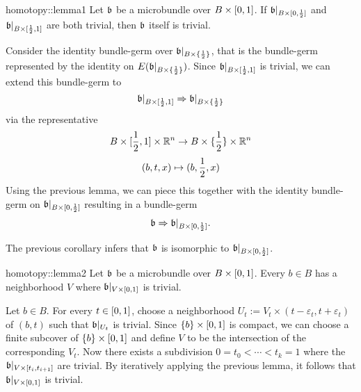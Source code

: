 \begin{scope}
\newcommand{\A}[1][] {
    A_\alpha#1
}

\newcommand{\bbleft} {
    \bb\restr{B \times{} [0, \half]}
}
\newcommand{\bbright} {
    \bb\restr{B \times{} [\half, 1]}
}
\newcommand{\bbhalf} {
    \bb\restr{B \times{} \{ \half \}}
}

\begin{mylemma}{homotopy::lemma1}
    Let $\mathfrak{b}$ be a microbundle over $B \times [0, 1]$. If $\bbleft$ and $\bbright$ are both trivial,
    then $\mathfrak{b}$ itself is trivial.
\end{mylemma}
\begin{myproof}
    Consider the identity bundle-germ over $\bbhalf$, that is the bundle-germ represented by the identity on $E(\bbhalf)$.
    Since $\bbright$ is trivial, we can extend this bundle-germ to 
    \[ \bbright \double \bbhalf \]
    via the representative
    \[ B \times [\frac{1}{2}, 1] \times \mathbb{R}^n \to B \times \{\frac{1}{2}\} \times \mathbb{R}^n \]
    \[ (b, t, x) \mapsto (b, \frac{1}{2}, x) \]
    Using the previous lemma, we can piece this together with the identity bundle-germ on $\bbleft$ resulting in a bundle-germ
    \[ \bb \double \bbleft. \]

    The previous corollary infers that $\mathfrak{b}$ is isomorphic to $\bbleft$.
\end{myproof}

\begin{mylemma}{homotopy::lemma2}
    Let $\mathfrak{b}$ be a microbundle over $B \times [0, 1]$.
    Every $b \in B$ has a neighborhood $V$ where $\mathfrak{b}\vert_{V \times [0, 1]}$ is trivial.
\end{mylemma}
\begin{myproof}
    Let $b \in B$.
    For every $t \in [0, 1]$, choose a neighborhood $U_t := V_t \times (t - \varepsilon_t, t + \varepsilon_t)$ of $(b, t)$ such that $\mathfrak{b}\vert_{U_t}$ is trivial.
    Since $\{b\} \times [0, 1]$ is compact, we can choose a finite subcover of $\{b\} \times [0, 1]$ and define $V$ to be the intersection of the corresponding $V_t$.
    Now there exists a subdivision $0 = t_0 < \cdots < t_k = 1$ where the $\mathfrak{b}\vert_{V \times [t_{i}, t_{i + 1}]}$ are trivial.
    By iteratively applying the previous lemma, it follows that $\mathfrak{b}\vert_{V \times [0, 1]}$ is trivial.
\end{myproof}


\end{scope}
